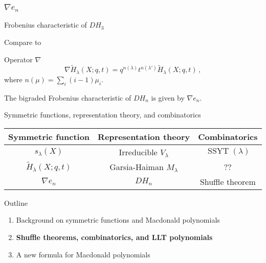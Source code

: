 \documentclass[dvipsnames,handout]{beamer}
\newcommand{\Htild}{\tilde{H}}
\DeclareMathOperator{\SSYT}{SSYT}
\theoremstyle{definition}
\newcounter{c}
\begin{document}
\begin{frame}
  \frametitle{\(\nabla e_n\)}
  Frobenius characteristic of \(DH_3\)\pause
  \begin{center}
    \pause
\end{center}
Compare to  
\begin{center}
  \end{center}\pause
  \begin{block}{Operator \(\nabla\)}
    \[
      \nabla \tilde{H}_\lambda(X;q,t) = q^{n(\lambda)} t^{n(\lambda')} \tilde{H}_\lambda(X;q,t)\,,
    \]
    where $n(\mu ) = \sum _{i} (i-1)\mu_{i}.$
  \end{block}\pause
  \begin{theorem}[Haiman, 2002]
    The bigraded Frobenius characteristic of \(DH_n\) is given by \(\nabla e_n\).
  \end{theorem}
\end{frame}
  \begin{frame}{Symmetric functions, representation theory, and combinatorics}
    \begin{tabular}{ccc}
      Symmetric function & Representation theory & Combinatorics 
      \\
      \hline
      \(s_\lambda(X)\) & Irreducible \(V_\lambda\) & \(\SSYT(\lambda)\) \\
      \(\Htild_\lambda(X;q,t)\) & Garsia-Haiman \(M_\lambda\) & ?? \\
      \(\nabla e_n\) & \(DH_n\) & Shuffle theorem
    \end{tabular}
  \end{frame}
\begin{frame}{Outline}
  \begin{enumerate}
  \item Background on symmetric functions and Macdonald polynomials
  \item {\bf Shuffle theorems, combinatorics, and LLT polynomials}
  \item A new formula for Macdonald polynomials
  \end{enumerate}
\end{frame}
\end{document}
